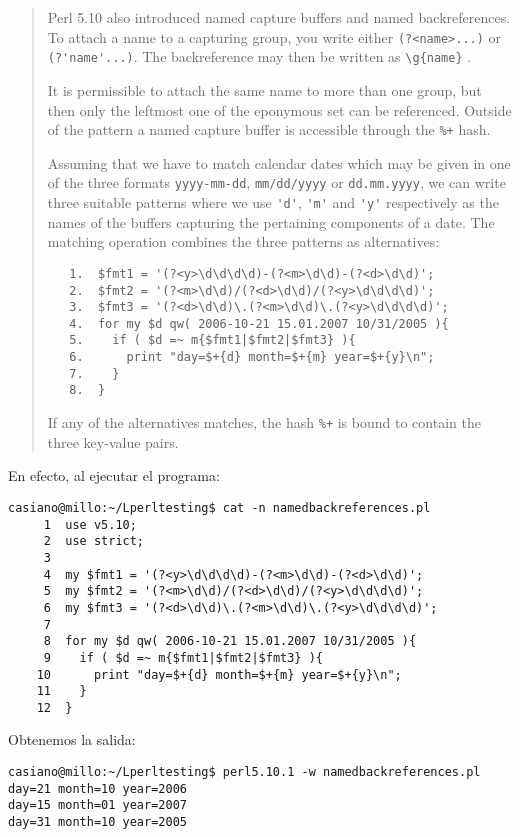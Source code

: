 \begin{it}
\begin{quotation}
Perl 5.10 also introduced named capture buffers and named
backreferences. To attach a name to a capturing group, you write either
\verb#(?<name>...)# or \verb#(?'name'...)#. The backreference may then be written
as \verb#\g{name}# . 

It is permissible to attach the same name to more than
one group, but then only the leftmost one of the eponymous set can be
referenced. Outside of the pattern a named capture buffer is accessible
through the \verb|%+| hash.

Assuming that we have to match calendar dates which may be given in one
of the three formats \verb|yyyy-mm-dd|, \verb|mm/dd/yyyy| or \verb|dd.mm.yyyy|, 
we can write
three suitable patterns where we use \verb|'d'|, \verb|'m'| and \verb|'y'| respectively as the
names of the buffers capturing the pertaining components of a date. The
matching operation combines the three patterns as alternatives:

\begin{verbatim}
   1.  $fmt1 = '(?<y>\d\d\d\d)-(?<m>\d\d)-(?<d>\d\d)';
   2.  $fmt2 = '(?<m>\d\d)/(?<d>\d\d)/(?<y>\d\d\d\d)';
   3.  $fmt3 = '(?<d>\d\d)\.(?<m>\d\d)\.(?<y>\d\d\d\d)';
   4.  for my $d qw( 2006-10-21 15.01.2007 10/31/2005 ){
   5.    if ( $d =~ m{$fmt1|$fmt2|$fmt3} ){
   6.      print "day=$+{d} month=$+{m} year=$+{y}\n";
   7.    }
   8.  }
\end{verbatim}

If any of the alternatives matches, the hash \verb|%+| 
is bound to contain the three key-value pairs.
\end{quotation}
\end{it}
En efecto, al ejecutar el programa:
\begin{verbatim}
casiano@millo:~/Lperltesting$ cat -n namedbackreferences.pl
     1  use v5.10;
     2  use strict;
     3
     4  my $fmt1 = '(?<y>\d\d\d\d)-(?<m>\d\d)-(?<d>\d\d)';
     5  my $fmt2 = '(?<m>\d\d)/(?<d>\d\d)/(?<y>\d\d\d\d)';
     6  my $fmt3 = '(?<d>\d\d)\.(?<m>\d\d)\.(?<y>\d\d\d\d)';
     7
     8  for my $d qw( 2006-10-21 15.01.2007 10/31/2005 ){
     9    if ( $d =~ m{$fmt1|$fmt2|$fmt3} ){
    10      print "day=$+{d} month=$+{m} year=$+{y}\n";
    11    }
    12  }
\end{verbatim}
Obtenemos la salida:
\begin{verbatim}
casiano@millo:~/Lperltesting$ perl5.10.1 -w namedbackreferences.pl
day=21 month=10 year=2006
day=15 month=01 year=2007
day=31 month=10 year=2005
\end{verbatim}

